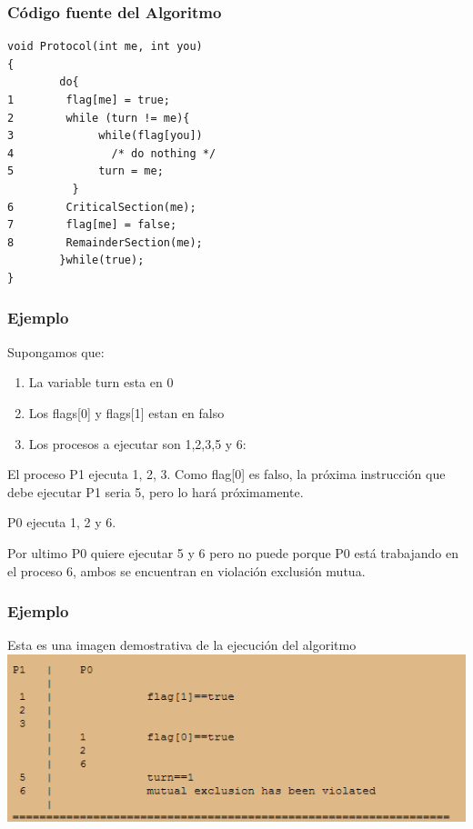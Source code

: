 \documentclass{beamer}
\begin{document}
\begin{frame}[fragile]

\frametitle{Código fuente del Algoritmo}

\begin{lstlisting}[frame=single]
void Protocol(int me, int you)
{
        do{
1        flag[me] = true;
2        while (turn != me){
3             while(flag[you])
4               /* do nothing */
5             turn = me;
          }
6        CriticalSection(me);
7        flag[me] = false;
8        RemainderSection(me);
        }while(true);
}
\end{lstlisting}
\end{frame}

\begin{frame}
\frametitle{Ejemplo} 
Supongamos que:
\begin {enumerate}[$*$]
\item La variable turn esta en 0 
\item Los flags[0] y flags[1] estan en falso
\item Los procesos a ejecutar son 1,2,3,5 y 6:
\end{enumerate}
El proceso P1 ejecuta 1, 2, 3. Como flag[0] es falso, la próxima instrucción que debe ejecutar P1 
seria 5, pero lo hará próximamente.\par
P0 ejecuta 1, 2 y 6.\par
Por ultimo P0 quiere ejecutar 5 y 6 pero no puede porque P0 está trabajando en el proceso 6, ambos 
se encuentran en violación exclusión mutua.
\end{frame}

\begin{frame}
\frametitle{Ejemplo} 
Esta es una imagen demostrativa de la ejecución del algoritmo
\includegraphics[width=1\textwidth]{scenario.png}
\end{frame}
\end{document}

